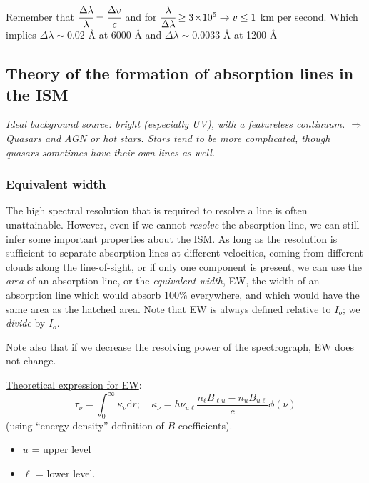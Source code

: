 \documentclass[12pt]{article}
\newcommand{\mar}[1]{\hspace{0pt}\marginpar{-\textcolor{black}{#1}-}}
\newcommand{\mynotes}[1]{{\fontfamily{cmss}\selectfont \textit{#1}}}
\begin{document}
\begin{framed}%
Remember that $\cfrac{\Delta\lambda}{\lambda} = \cfrac{\Delta{v}}{c}$
and for $\cfrac{\lambda}{\Delta\lambda} \ge 3\!\times\!10^{5}
\rightarrow v \le 1$ km per second. Which implies
$\Delta\lambda \sim 0.02$ \AA{} at 6000 \AA{} and
$\Delta\lambda \sim 0.0033$ \AA{} at 1200 \AA{}
\end{framed}

\subsection{Theory of the formation of absorption lines in the ISM}
\mynotes{Ideal background source: bright (especially UV), with a
featureless continuum. $\Rightarrow$ Quasars and AGN or hot stars.
Stars tend to be more complicated, though quasars sometimes have
their own lines as well.}

\subsubsection{Equivalent width}
The high spectral resolution that is required to resolve a line is often
unattainable. However, even if we cannot \emph{resolve} the absorption line, we
can still infer some important properties about the ISM. As long as the
resolution is sufficient to separate absorption lines at different velocities,
coming from different clouds along the line-of-sight, or if only one component
is present, we can use the \emph{area} of an absorption line, or the
\textit{equivalent width}, EW, the width of an absorption line which would
absorb 100\% everywhere, and which would have the same area as the hatched
area. Note that EW is always defined relative to $I_{o}$; we \emph{divide} by
$I_{o}$.

\mar{91}Note also that if we decrease the resolving power of the
spectrograph, EW does not change.

\newpage
\underline{Theoretical expression for EW}:
\[
    \tau_{\nu} = \int_{0}^{\infty}{\kappa_{\nu}\mathrm{d}r};\quad
    \kappa_{\nu} = h\nu_{u\ell}
    \frac{n_{\ell}B_{\ell{u}}-n_{u}B_{u\ell}}{c}\phi(\nu)
    \]
(using ``energy density'' definition of $B$ coefficients).
\begin{itemize}
    \item $u$ = upper level
    \item $\ell$ = lower level.
\end{itemize}
\end{document}
